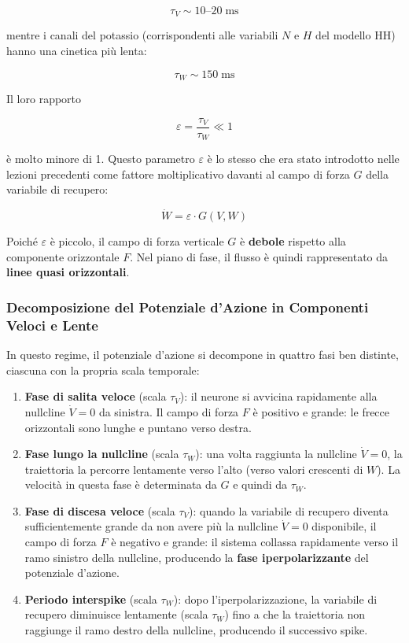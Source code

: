\begin{equation}
\tau_V \sim 10\text{–}20 \; \text{ms}
\end{equation}

mentre i canali del potassio (corrispondenti alle variabili $N$ e $H$ del modello HH) hanno una cinetica più lenta:

\begin{equation}
\tau_W \sim 150 \; \text{ms}
\end{equation}

Il loro rapporto

\begin{equation}
\varepsilon = \frac{\tau_V}{\tau_W} \ll 1
\end{equation}

è molto minore di 1. Questo parametro $\varepsilon$ è lo stesso che era stato introdotto nelle lezioni precedenti come fattore moltiplicativo davanti al campo di forza $G$ della variabile di recupero:

\begin{equation}
\dot{W} = \varepsilon \cdot G(V, W)
\end{equation}

Poiché $\varepsilon$ è piccolo, il campo di forza verticale $G$ è \textbf{debole} rispetto alla componente orizzontale $F$. Nel piano di fase, il flusso è quindi rappresentato da \textbf{linee quasi orizzontali}.

\subsubsection{Decomposizione del Potenziale d'Azione in Componenti Veloci e Lente}

In questo regime, il potenziale d'azione si decompone in quattro fasi ben distinte, ciascuna con la propria scala temporale:

\begin{enumerate}
    \item \textbf{Fase di salita veloce} (scala $\tau_V$): il neurone si avvicina rapidamente alla nullcline $\dot{V}=0$ da sinistra. Il campo di forza $F$ è positivo e grande: le frecce orizzontali sono lunghe e puntano verso destra.
    \item \textbf{Fase lungo la nullcline} (scala $\tau_W$): una volta raggiunta la nullcline $\dot{V}=0$, la traiettoria la percorre lentamente verso l'alto (verso valori crescenti di $W$). La velocità in questa fase è determinata da $G$ e quindi da $\tau_W$.
    \item \textbf{Fase di discesa veloce} (scala $\tau_V$): quando la variabile di recupero diventa sufficientemente grande da non avere più la nullcline $\dot{V}=0$ disponibile, il campo di forza $F$ è negativo e grande: il sistema collassa rapidamente verso il ramo sinistro della nullcline, producendo la \textbf{fase iperpolarizzante} del potenziale d'azione.
    \item \textbf{Periodo interspike} (scala $\tau_W$): dopo l'iperpolarizzazione, la variabile di recupero diminuisce lentamente (scala $\tau_W$) fino a che la traiettoria non raggiunge il ramo destro della nullcline, producendo il successivo spike.
\end{enumerate}

